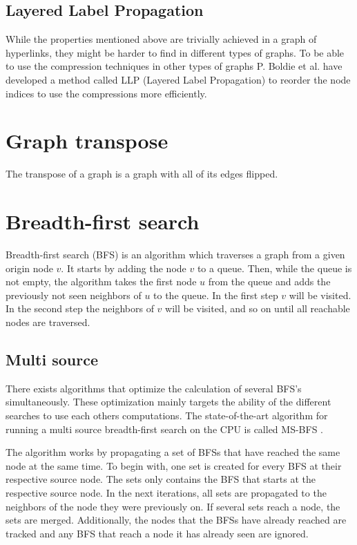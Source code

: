 \subsection{Layered Label Propagation}

While the properties mentioned above are trivially achieved in a graph of hyperlinks, they might be harder to find in different types of graphs. To be able to use the compression techniques in other types of graphs P. Boldie et al. have developed a method called LLP (Layered Label Propagation) \cite{llp} to reorder the node indices to use the compressions more efficiently. 

\section{Graph transpose}
The transpose of a graph is a graph with all of its edges flipped. 

\section{Breadth-first search}
Breadth-first search (BFS) is an algorithm which traverses a graph from a given origin node $v$. It starts by adding the node $v$ to a queue. Then, while the queue is not empty, the algorithm takes the first node $u$ from the queue and adds the previously not seen neighbors of $u$ to the queue. In the first step $v$ will be visited. In the second step the neighbors of $v$ will be visited, and so on until all reachable nodes are traversed.

\subsection{Multi source}
There exists algorithms that optimize the calculation of several BFS's simultaneously. These optimization mainly targets the ability of the different searches to use each others computations. The state-of-the-art algorithm for running a multi source breadth-first search on the CPU is called MS-BFS \cite{msbfs}.

The algorithm works by propagating a set of BFSs that have reached the same node at the same time. To begin with, one set is created for every BFS at their respective source node. The sets only contains the BFS that starts at the respective source node. In the next iterations, all sets are propagated to the neighbors of the node they were previously on. If several sets reach a node, the sets are merged. Additionally, the nodes that the BFSs have already reached are tracked and any BFS that reach a node it has already seen are ignored. 

